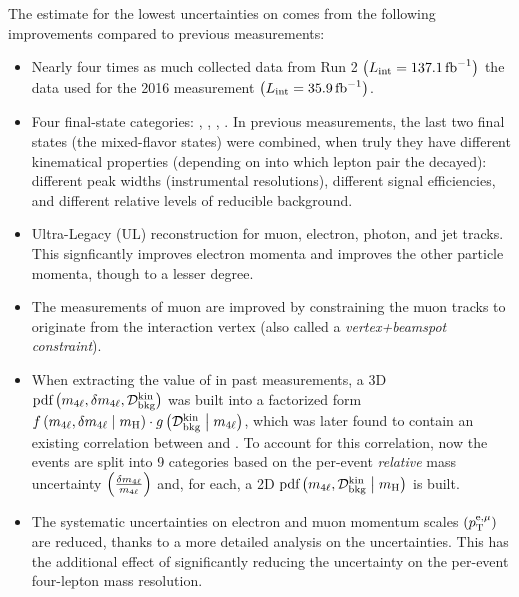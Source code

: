 The estimate for the lowest uncertainties on \mH comes from the following improvements compared to previous measurements:
\begin{itemize}
    \item Nearly four times as much collected data from Run 2 $\left( L_\text{int} = 137.1\,\text{fb}^{\text{$-$}1} \right)$ \vs the data used for the 2016 measurement $\left( L_\text{int} = 35.9\,\text{fb}^{\text{$-$}1} \right)$.
    \item Four final-state categories: \fourmu, \foure, \twoetwomu, \twomutwoe.
    In previous measurements, the last two final states (the mixed-flavor states) were combined, when truly they have different kinematical properties (depending on into which lepton pair the \Zone decayed):
    different peak widths (instrumental resolutions), different signal efficiencies, and different relative levels of reducible background.
    \item Ultra-Legacy (UL) reconstruction for muon, electron, photon, and jet tracks.
    This signficantly improves electron momenta and improves the other particle momenta, though to a lesser degree.
    \item The measurements of muon \pt are improved by constraining the muon tracks to originate from the interaction vertex (also called a \emph{vertex+beamspot constraint}).
    \item When extracting the value of \mH in past measurements, a 3D $\text{pdf} \left( m_{4\ell}, \delta m_{4\ell}, \mathcal{D}^{\text{kin}}_{\text{bkg}} \right)$ was built into a factorized form
    $f \left( m_{4\ell}, \delta m_{4\ell} \; \middle| \;{} m_{\mathrm{H}} \right)   \cdot   g\left( \mathcal{D}^{\text{kin}}_{\text{bkg}} \; \middle| \;{} m_{4\ell} \right)$,
    which was later found to contain an existing correlation between \mfourlerr and \Dkinbkg.
    To account for this correlation, now the events are split into 9 categories based on the per-event \emph{relative} mass uncertainty $\left( \frac{\delta m_{4\ell}}{m_{4\ell}} \right)$ and, for each, a 2D $\text{pdf} \left( m_{4\ell}, \mathcal{D}^{\text{kin}}_{\text{bkg}} \; \middle| \;{} m_{\mathrm{H}} \right)$ is built.
    \item The systematic uncertainties on electron and muon momentum scales $\left( p_{\mathrm{T}}^{\mathrm{e}, \mu} \right)$ are reduced, thanks to a more detailed analysis on the uncertainties.
    This has the additional effect of significantly reducing the uncertainty on the per-event four-lepton mass resolution.
\end{itemize}

